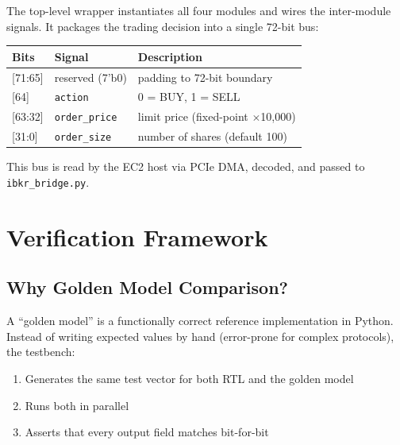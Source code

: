 \documentclass[11pt,a4paper]{article}
\begin{document}
The top-level wrapper instantiates all four modules and wires the inter-module
signals. It packages the trading decision into a single 72-bit bus:

\begin{center}
\small
\begin{tabular}{l l l}
\toprule
\textbf{Bits} & \textbf{Signal} & \textbf{Description} \\
\midrule
{[71:65]} & reserved (7'b0)    & padding to 72-bit boundary \\
{[64]}    & \texttt{action}     & 0 = BUY, 1 = SELL \\
{[63:32]} & \texttt{order\_price} & limit price (fixed-point $\times$10{,}000) \\
{[31:0]}  & \texttt{order\_size}  & number of shares (default 100) \\
\bottomrule
\end{tabular}
\end{center}

\noindent This bus is read by the EC2 host via PCIe DMA, decoded, and passed to
\texttt{ibkr\_bridge.py}.

\section{Verification Framework}

\subsection{Why Golden Model Comparison?}

A ``golden model'' is a functionally correct reference implementation in Python.
Instead of writing expected values by hand (error-prone for complex protocols),
the testbench:
\begin{enumerate}
  \item Generates the same test vector for both RTL and the golden model
  \item Runs both in parallel
  \item Asserts that every output field matches bit-for-bit
\end{enumerate}
\end{document}
